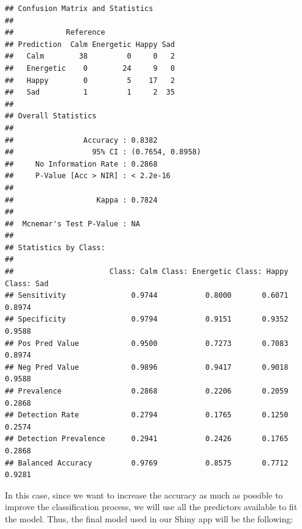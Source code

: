 \documentclass[11pt,]{article}
\begin{document}
\begin{verbatim}
## Confusion Matrix and Statistics
## 
##            Reference
## Prediction  Calm Energetic Happy Sad
##   Calm        38         0     0   2
##   Energetic    0        24     9   0
##   Happy        0         5    17   2
##   Sad          1         1     2  35
## 
## Overall Statistics
##                                           
##                Accuracy : 0.8382          
##                  95% CI : (0.7654, 0.8958)
##     No Information Rate : 0.2868          
##     P-Value [Acc > NIR] : < 2.2e-16       
##                                           
##                   Kappa : 0.7824          
##                                           
##  Mcnemar's Test P-Value : NA              
## 
## Statistics by Class:
## 
##                      Class: Calm Class: Energetic Class: Happy Class: Sad
## Sensitivity               0.9744           0.8000       0.6071     0.8974
## Specificity               0.9794           0.9151       0.9352     0.9588
## Pos Pred Value            0.9500           0.7273       0.7083     0.8974
## Neg Pred Value            0.9896           0.9417       0.9018     0.9588
## Prevalence                0.2868           0.2206       0.2059     0.2868
## Detection Rate            0.2794           0.1765       0.1250     0.2574
## Detection Prevalence      0.2941           0.2426       0.1765     0.2868
## Balanced Accuracy         0.9769           0.8575       0.7712     0.9281
\end{verbatim}

In this case, since we want to increase the accuracy as much as possible
to improve the classification process, we will use all the predictors
available to fit the model. Thus, the final model used in our Shiny app
will be the following:
\end{document}
